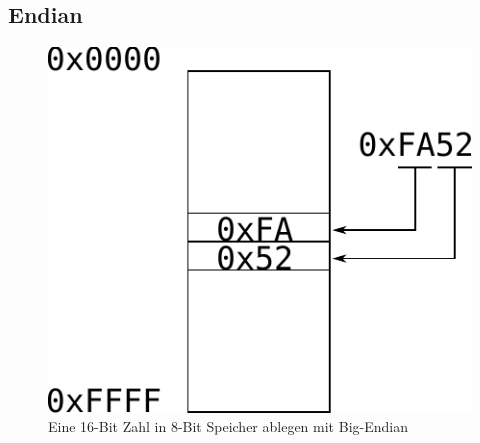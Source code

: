 \subsection{Endian}
\begin{figure}[h!]
	\centering
	\includegraphics[scale=0.5]{../fig/endian.pdf}
	\caption{Eine 16-Bit Zahl in 8-Bit Speicher ablegen mit Big-Endian}
\end{figure}


